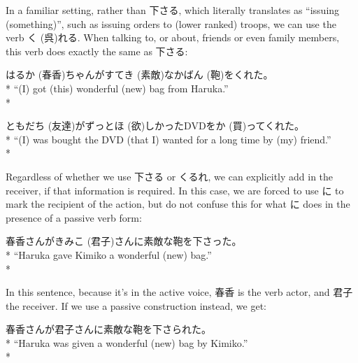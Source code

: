 \documentclass[11pt, b5paper, twoside, openright, onecolumn]{book}
\makeatletter
\newcommand*{\rubystack}[2]{{\relscale{0.5}%
  \begin{tabular}[b]{@{}c@{}}%
    {#1}\\%
   {\textscale{2}{#2}}%
  \end{tabular}}%
}
\DeclareRobustCommand*{\ruby}[2]{%
  \mbox{%
    \setlength{\parskip}{0ex}%
    \BeginAccSupp{method=pdfstringdef,ActualText={#1}}%
      \rubystack{\phantom{#2}}{#1}%
      \llap{%
        \rubystack{#2}{\phantom{#1}}%
      }%
    \EndAccSupp{}%
  }%
}
\renewcommand*{\ruby}[2]{#2 (#1)}%
\newenvironment{exampleblock}{
\setlength{\parindent}{0.6in}
\begin{minipage}[t]{\dimexpr\textwidth-\parindent}}
{\end{minipage}}
\makeatother
\begin{document}
In a familiar setting‚ rather than 下さる‚ which literally translates as “issuing (something)”‚ such as issuing orders to (lower ranked) troops‚ we can use the verb \ruby{呉}{く}れる. When talking to‚ or about‚ friends or even family members‚ this verb does exactly the same as 下さる:

\vspace{0.4cm}
\begin{exampleblock}
\ruby{春香}{はるか}ちゃんが\ruby{素敵}{すてき}な\ruby{鞄}{かばん}をくれた。 \\* 
“(I) got (this) wonderful (new) bag from Haruka.” \\* 
\end{exampleblock}
\vspace{0.2cm}

\begin{exampleblock}
\ruby{友達}{ともだち}がずっと\ruby{欲}{ほ}しかったDVDを\ruby{買}{か}ってくれた。 \\* 
“(I) was bought the DVD (that I) wanted for a long time by (my) friend.” \\* 
\end{exampleblock}
\vspace{0.2cm}

Regardless of whether we use 下さる or くるれ‚ we can explicitly add in the receiver‚ if that information is required. In this case‚ we are forced to use に to mark the recipient of the action‚ but do not confuse this for what に does in the presence of a passive verb form:

\vspace{0.4cm}
\begin{exampleblock}
春香さんが\ruby{君子}{きみこ}さんに素敵な鞄を下さった。 \\* 
“Haruka gave Kimiko a wonderful (new) bag.” \\* 
\end{exampleblock}
\vspace{0.2cm}

In this sentence‚ because it’s in the active voice‚ 春香 is the verb actor‚ and 君子 the receiver. If we use a passive construction instead‚ we get:

\vspace{0.4cm}
\begin{exampleblock}
春香さんが君子さんに素敵な鞄を下さられた。 \\* 
“Haruka was given a wonderful (new) bag by Kimiko.” \\* 
\end{exampleblock}
\vspace{0.2cm}
\end{document}
